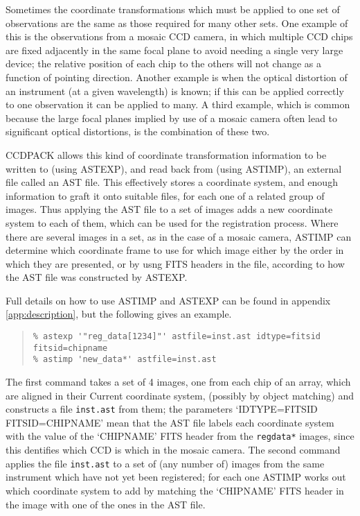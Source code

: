 \documentclass[twoside,11pt]{article}
\newcommand{\hyperref}[4]{#2\ref{#4}#3}
\newcommand{\latexhtml}[2]{#1}
\renewcommand{\_}{\texttt{\symbol{95}}}
\newcommand{\ttsize}{\latexhtml{\small}{}}
\newenvironment{myquote}{\begin{quote}\ttsize}{\end{quote}}
\newcommand{\text}[1]{{\ttsize \tt #1}}
\newcommand{\routine}[1]{{\sc #1}}
\begin{document}
Sometimes the coordinate transformations which must be applied
to one set of observations are the same as those
required for many other sets.
One example of this is the observations from a mosaic
CCD camera, in which multiple CCD chips are fixed adjacently 
in the same focal plane to avoid needing a single very large device;
the relative position of each chip to the others 
will not change as a function of pointing direction.
Another example is when the optical distortion of an instrument
(at a given wavelength) is known; if this can be applied
correctly to one observation it can be applied to many.
A third example, which is common because the large focal planes
implied by use of a mosaic camera often lead to significant
optical distortions, is the combination of these two.

CCDPACK allows this kind of coordinate transformation information to 
be written to (using \routine{ASTEXP}), 
and read back from (using \routine{ASTIMP}),
an external file called an AST file.
This effectively stores a coordinate system, and enough information
to graft it onto suitable files, for each one of a related group
of images.
Thus applying the AST file to a set of images adds a new 
coordinate system to
each of them, which can be used for the registration process.
Where there are several images in a set, as in the case of 
a mosaic camera, \routine{ASTIMP} can determine which coordinate frame to
use for which image either by the order in which they are presented,
or by usng FITS headers in the file, 
according to how the AST file was constructed by \routine{ASTEXP}.

Full details on how to use \routine{ASTIMP} and \routine{ASTEXP}
can be found in \hyperref{an appendix}{appendix }{}{app:description},
but the following gives an example.
\begin{myquote}
\begin{verbatim}
% astexp '"reg_data[1234]"' astfile=inst.ast idtype=fitsid fitsid=chipname
% astimp 'new_data*' astfile=inst.ast
\end{verbatim}
\end{myquote}
The first command takes a set of 4 images, one from each chip of an array,
which are aligned in their Current coordinate system, 
(possibly by object matching)
and constructs a file \text{inst.ast} from them;
the parameters `IDTYPE=FITSID FITSID=CHIPNAME' 
mean that the AST file labels each coordinate system with the
value of the `CHIPNAME' FITS header from the \text{reg\_data*} images,
since this dentifies which CCD is which in the mosaic camera.
The second command applies the file \text{inst.ast}
to a set of (any number of) images from the same 
instrument which have not yet been registered;
for each one \routine{ASTIMP} works out which coordinate system to 
add by matching the `CHIPNAME' FITS header in the image with one of 
the ones in the AST file.
\end{document}
